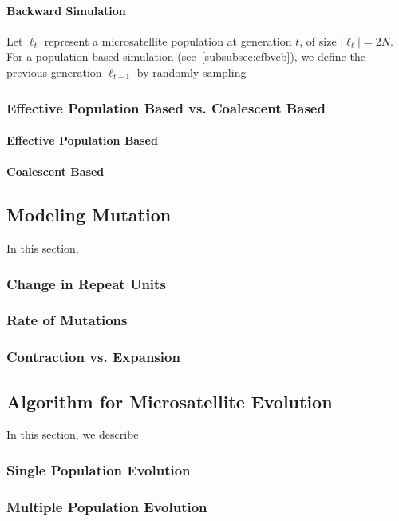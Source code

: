 \paragraph{Backward Simulation}
Let $\ell_t$ represent a microsatellite population at generation $t$, of size $|\ell_t | = 2N$.
For a population based simulation (see~\autoref{subsubsec:efbvcb}), we define the previous generation $\ell_{t - 1}$ by
randomly sampling

\subsubsection{Effective Population Based vs. Coalescent Based}\label{subsubsec:efbvcb}
\paragraph{Effective Population Based}
\paragraph{Coalescent Based}

\subsection{Modeling Mutation}\label{subsec:mm}
In this section,

\subsubsection{Change in Repeat Units}
\subsubsection{Rate of Mutations}
\subsubsection{Contraction vs. Expansion}

\subsection{Algorithm for Microsatellite Evolution}\label{subsec:afme}
In this section, we describe
\subsubsection{Single Population Evolution}
\subsubsection{Multiple Population Evolution}